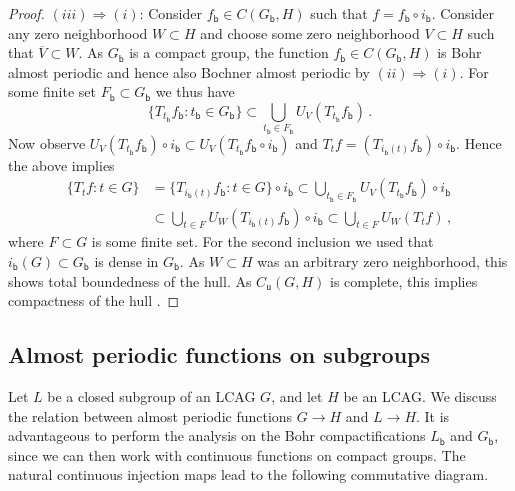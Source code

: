 \documentclass[11pt, a4wide]{amsart}
\numberwithin{lemma}{section}
\begin{document}
\begin{appendix}
\begin{proof}
\noindent  $(iii) \Rightarrow  (i)$:  Consider $f_\mathsf{b}\in C(G_\mathsf{b},H)$ such that $f=f_\mathsf{b}\circ i_\mathsf{b}$. Consider any zero neighborhood $W\subset H$ and choose some zero neighborhood $V\subset H$ such that $\overline{V}\subset W$. As $G_\mathsf{b}$ is a compact group, the function $f_\mathsf{b}\in C(G_\mathsf{b},H)$ is Bohr almost periodic and hence also Bochner almost periodic by $(ii) \Rightarrow (i)$. For some finite set $F_\mathsf{b}\subset G_\mathsf{b}$ we thus have
%
\begin{displaymath}
\{T_{t_\mathsf{b}} f_\mathsf{b}: t_\mathsf{b}\in G_\mathsf{b}\} \subset \bigcup_{t_\mathsf{b}\in F_\mathsf{b}} U_V(T_{t_\mathsf{b}}f_\mathsf{b})\,.
\end{displaymath}
%
Now observe $U_V(T_{t_\mathsf{b}} f_\mathsf{b})\circ i_\mathsf{b} \subset U_V(T_{t_\mathsf{b}}f_\mathsf{b}\circ i_\mathsf{b})$ and  $T_tf=(T_{i_\mathsf{b}(t)}f_\mathsf{b})\circ i_\mathsf{b}$. Hence the above implies
%
\begin{displaymath}
\begin{split}
\{T_tf: t\in G\}&=\{T_{i_\mathsf{b}(t)}f_\mathsf{b}: t\in G\} \circ i_\mathsf{b}\subset \bigcup_{t_\mathsf{b}\in F_\mathsf{b}} U_V(T_{t_\mathsf{b}}f_\mathsf{b}) \circ i_\mathsf{b} \\
&\subset \bigcup_{t\in F} U_W(T_{i_\mathsf{b}(t)}f_\mathsf{b}) \circ i_\mathsf{b} \subset \bigcup_{t\in F} U_W(T_{t}f)\,,
\end{split}
\end{displaymath}
%
where $F\subset G$ is some finite set. For the second inclusion we used that $i_\mathsf{b}(G)\subset G_\mathsf{b}$ is dense in $G_\mathsf{b}$. As $W\subset H$ was an arbitrary zero neighborhood,  this shows total boundedness of the hull. As $C_\mathsf{u}(G,H)$ is complete, this implies compactness of the hull \cite[Ch.~6.32]{Kel}.
\end{proof}

\subsection{Almost periodic functions on subgroups}\label{app:apsg}

Let $L$ be a closed subgroup of an LCAG $G$, and let $H$ be an LCAG. We discuss the relation between almost periodic functions $G\to H$ and $L\to H$. It is advantageous to perform the analysis on the Bohr compactifications $L_\mathsf{b}$ and $G_\mathsf{b}$, since we can then work with continuous functions on compact groups. The natural continuous injection maps lead to the following commutative diagram.


\end{appendix}
\end{document}

